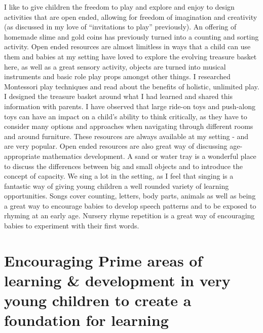 \documentclass[10pt,a4paper]{report}
\begin{document}
I like to give children the freedom to play and explore and enjoy to design activities that are open ended, allowing for freedom of imagination and creativity (as discussed in my love of “invitations to play” previously). An offering of homemade slime and gold coins has previously turned into a counting and sorting activity. Open ended resources are almost limitless in ways that a child can use them and babies at my setting have loved to explore the evolving treasure basket here, as well as a great sensory activity, objects are turned into musical instruments and basic role play props amongst other things. I researched Montessori play techniques and read about the benefits of holistic, unlimited play. I designed the treasure basket around what I had learned and shared this information with parents. I have observed that large ride-on toys and push-along toys can have an impact on a child's ability to think critically, as they have to consider many options and approaches when navigating through different rooms and around furniture. These resources are always available at my setting - and are very popular. Open ended resources are also great way of discussing age-appropriate mathematics development. A sand or water tray is a wonderful place to discuss the differences between big and small objects and to introduce the concept of capacity. 
We sing a lot in the setting, as I feel that singing is a fantastic way of giving young children a well rounded variety of learning opportunities. Songs cover counting, letters, body parts, animals as well as being a great way to encourage babies to develop speech patterns and to be exposed to rhyming at an early age. Nursery rhyme repetition is a great way of encouraging babies to experiment with their first words. 

\section{Encouraging Prime areas of learning \& development in very young children to create a foundation for learning}
\end{document}
